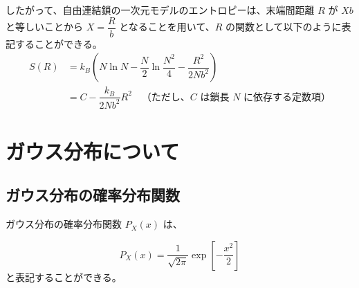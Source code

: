 \documentclass[a4paper,11pt]{ltjsarticle}
\begin{document}
\begin{appendix}
したがって、自由連結鎖の一次元モデルのエントロピーは、末端間距離 $R$ が $Xb$ と等しいことから $X = \dfrac{R}{b}$ となることを用いて、$R$ の関数として以下のように表記することができる。
\begin{align*}
S(R)
	&= k_B \left( N\ln N - \dfrac{N}{2} \ln \dfrac{N^2}{4} - \dfrac{R^2}{2Nb^2} \right) \\
	&= C -\dfrac{ k_B}{2Nb^2}R^2 \quad \text{（ただし、$C$ は鎖長 $N$ に依存する定数項）}
\end{align*}

%
%

\newpage
\section{ガウス分布について}
\label{sec:gauss}

\subsection{ガウス分布の確率分布関数}

ガウス分布の確率分布関数 $P_X(x)$ は、

\begin{equation*}
P_X(x) = \frac{1}{\sqrt{2 \pi}} \exp \left[- \frac{x^2}{2} \right]
\end{equation*}
と表記することができる。


\end{appendix}
\end{document}
